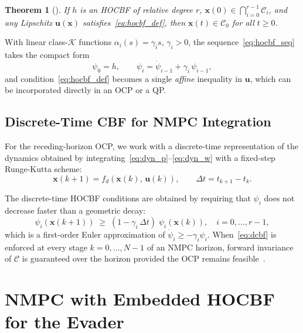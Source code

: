 \documentclass[lettersize,journal]{IEEEtran}
\newtheorem{theorem}{Theorem}
\theoremstyle{definition}
\theoremstyle{remark}
\newcommand{\vect}[1]{\bm{#1}}
\begin{document}
\begin{theorem}[\cite{xiao2021high}]
\label{thm:hocbf}
If $h$ is an HOCBF of relative degree $r$,
$\vect{x}(0)\in\bigcap_{i=0}^{r-1}\mathcal{C}_i$, and any Lipschitz
$\vect{u}(\vect{x})$ satisfies~\eqref{eq:hocbf_def}, then
$\vect{x}(t)\in\mathcal{C}_0$ for all $t \geq 0$.
\end{theorem}

With linear class-$\mathcal{K}$ functions
$\alpha_i(s) = \gamma_i s$, $\gamma_i > 0$, the
sequence~\eqref{eq:hocbf_seq} takes the compact form
\begin{equation}
    \psi_0 = h,\qquad
    \psi_i = \dot{\psi}_{i-1} + \gamma_i\,\psi_{i-1},
    \label{eq:hocbf_linear}
\end{equation}
and condition~\eqref{eq:hocbf_def} becomes a single \emph{affine}
inequality in $\vect{u}$, which can be incorporated directly in an
OCP or a QP.

\subsection{Discrete-Time CBF for NMPC Integration}
\label{sec:dcbf}

For the receding-horizon OCP, we work with a discrete-time
representation of the dynamics obtained by integrating~\eqref{eq:dyn_p}--\eqref{eq:dyn_w}
with a fixed-step Runge-Kutta scheme:
\begin{equation}
    \vect{x}(k+1) = f_d\!\left(\vect{x}(k),\,\vect{u}(k)\right),
    \qquad \Delta t = t_{k+1} - t_k.
    \label{eq:discrete_dyn}
\end{equation}

The discrete-time HOCBF conditions are obtained by requiring that
$\psi_i$ does not decrease faster than a geometric decay:
\begin{equation}
    \psi_i\!\left(\vect{x}(k+1)\right)
    \;\geq\;
    (1 - \gamma_i\,\Delta t)\;\psi_i\!\left(\vect{x}(k)\right),
    \quad i = 0,\ldots,r-1,
    \label{eq:dcbf}
\end{equation}
which is a first-order Euler approximation of
$\dot\psi_i \geq -\gamma_i\psi_i$.
When~\eqref{eq:dcbf} is enforced at every stage
$k = 0,\ldots,N-1$ of an NMPC horizon, forward invariance of
$\mathcal{C}$ is guaranteed over the horizon provided the OCP
remains feasible~\cite{zeng2021safety}.

\section{NMPC with Embedded HOCBF for the Evader}
\label{sec:nmpc_cbf}
\end{document}
